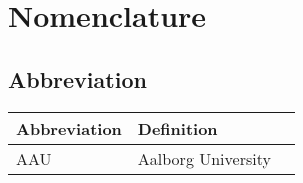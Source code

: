 \chapter*{Nomenclature}\label{ch:nomenclature}
\section*{Abbreviation}
\begin{longtable}[H]{p{80pt} p{300pt} p{40pt}}
\textbf{Abbreviation}	& \textbf{Definition} & \textbf{ } \\ \hline
AAU	  & Aalborg University    		&\\

\end{longtable}

